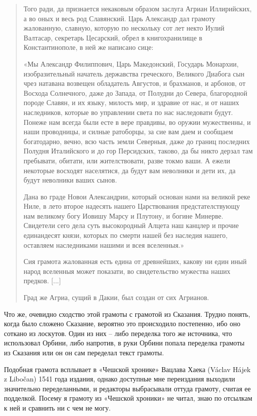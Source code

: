 \begin{quotation}
Того ради, да признается некаковым образом заслуга Агриан Иллирийских, а во оных и весь род Славянский. Царь Александр дал грамоту жалованную, славную, которую по неско\-льку сот лет некто Иулий Валтасар, секретарь Цесарский, обрел в книгохранилище в Константинополе, в ней же написано сице:

«Мы Александр Филиппович, Царь Македонский, Государь Монархии, изобразительный начатель державства греческого, Великого Диабога сын чрез натавана возвещен обладатель Августов, и брахманов, и арбонов, от Восхода Солнечного, даже до Запада, от Полудни до Севера, благородной породе Славян, и их языку, милость мир, и здравие от нас, и от наших наследников, которые во управлении света по нас наследовати будут. Понеже нам всегда были есте в вере правдивы, во оружии мужественны, и наши проводницы, и силные ратоборцы, за сие вам даем и сообщаем богатодарно, вечно, всю часть земли Северныя, даже до границ последних Полудня Италийского и до гор Персидских, таково, да бы никто дерзал там пребывати, обитати, или жителствовати, разве токмо ваши. А ежели некоторые восходят населятися, да будут вам неволники и дети их, да будут неволники ваших сынов.

Дана во граде Новои Александрии, который основан нами на великой реке Ниле, в лето второе надесять нашего Царствования предстателствующу нам великому богу Иовишу Марсу и Плутону, и богине Минерве. Свидетели сего дела суть высокородный Алцета наш канцлер и прочие единандесят князи, которых по смерти нашей без наследия нашего, оставляем наследниками нашими и всея вселенныя.»

Сия грамота жалованная есть едина от древнейших, какову ни един иный народ вселенныя может показати, во свидетельство мужества наших предков. [...]

Град же Агриа, сущий в Дакии, был создан от сих Агрианов.
\end{quotation}

Что же, очевидно сходство этой грамоты с грамотой из Сказания. Трудно понять, когда было сложено Сказание, вероятно это происходило постепенно, ибо оно соткано из лоскутов. Один из них – либо переделка того же источника, что использовал Орбини, либо напротив, в руки Орбини попала переделка грамоты из Сказания или он он сам переделал текст грамоты. 

Подобная грамота всплывает в «Чешской хронике» Вацлава Хаека (Václav Hájek z Libočan) 1541 года издания, однако доступные мне переиздания выходили значительно переделанными, и редакторы выбрасывали оттуда грамоту, считая ее подделкой. Посему я грамоту из «Чешской хроники» не читал, знаю по отсылкам к ней и сравнить ни с чем не могу.

